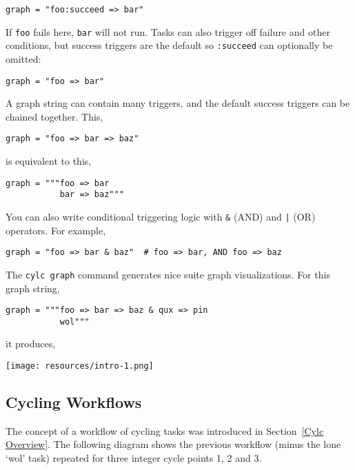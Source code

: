 \begin{lstlisting}[language=suiterc]
graph = "foo:succeed => bar"
\end{lstlisting}

If \lstinline{foo} fails here, \lstinline{bar} will not run.  Tasks can also
trigger off failure and other conditions, but success triggers are the default
so \lstinline=:succeed= can optionally be omitted:

\begin{lstlisting}[language=suiterc]
graph = "foo => bar"
\end{lstlisting}

A graph string can contain many triggers, and the default success triggers can
be chained together. This,

\begin{lstlisting}[language=suiterc]
graph = "foo => bar => baz"
\end{lstlisting}

is equivalent to this,

\begin{lstlisting}[language=suiterc]
graph = """foo => bar
           bar => baz"""
\end{lstlisting}

You can also write conditional triggering logic with \lstinline=&= (AND) and
\lstinline=|= (OR) operators. For example,

\begin{lstlisting}[language=suiterc]
graph = "foo => bar & baz"  # foo => bar, AND foo => baz
\end{lstlisting}

The \lstinline=cylc graph= command generates nice suite graph visualizations.
For this graph string,

\begin{lstlisting}[language=suiterc]
graph = """foo => bar => baz & qux => pin
           wol"""
\end{lstlisting}

it produces,

\begin{center}
\texttt{[image: resources/intro-1.png]} %
\end{center}

\subsection{Cycling Workflows}

The concept of a workflow of cycling tasks was introduced in Section~\ref{Cylc
Overview}.  The following diagram shows the previous workflow (minus the lone
`wol' task) repeated for three integer cycle points 1, 2 and 3.

